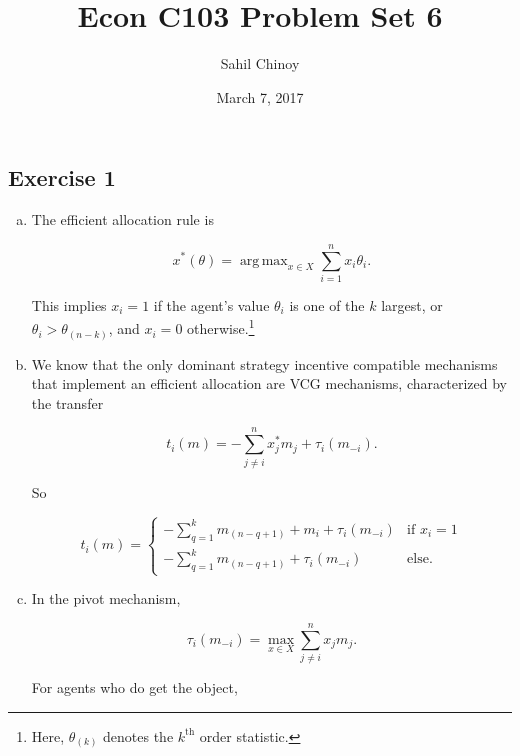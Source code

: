 \documentclass{article}
\title{Econ C103 Problem Set 6}
\author{Sahil Chinoy}
\date{March 7, 2017}
\DeclareMathOperator*{\argmax}{arg\,max}
\begin{document}
\maketitle{}

\subsection*{Exercise 1}

\begin{enumerate}[(a)]
	\item

	The efficient allocation rule is

	\begin{equation*}
	x^*(\theta) = \argmax_{x \in X} \sum \limits_{i=1}^n x_i \theta_i.
	\end{equation*}

	This implies $x_i = 1$ if the agent's value $\theta_i$ is one of the $k$ largest, or $\theta_i > \theta_{(n-k)}$, and $x_i = 0$ otherwise.\footnote{Here, $\theta_{(k)}$ denotes the $k^\text{th}$ order statistic.}

	\item

	We know that the only dominant strategy incentive compatible mechanisms that implement an efficient allocation are VCG mechanisms, characterized by the transfer

	\begin{equation*}
	t_i(m) = -\sum \limits_{j \neq i}^n x^*_j m_j + \tau_i(m_{-i}).
	\end{equation*}

	So

	\begin{equation*}
	t_i(m) =
	\begin{cases} 
      -\sum \limits_{q=1}^k m_{(n-q+1)} + m_i + \tau_i(m_{-i}) & \text{if } x_i = 1 \\
      -\sum \limits_{q=1}^k m_{(n-q + 1)} + \tau_i(m_{-i}) & \text{else.}
   	\end{cases}
	\end{equation*}

	\item

	In the pivot mechanism,

	\begin{equation*}
	\tau_i(m_{-i}) = \max \limits_{x \in X} \sum \limits_{j \neq i}^n x_j m_j.
	\end{equation*}

	For agents who do get the object,


\end{enumerate}
\end{document}
